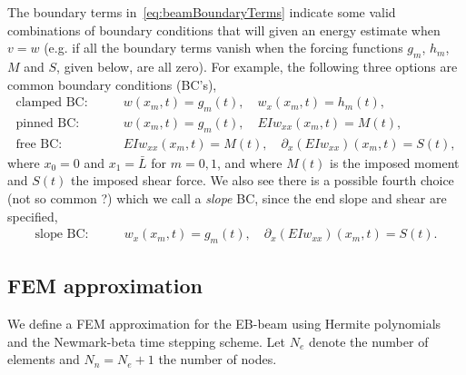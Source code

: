 \documentclass[11pt]{article}
\newcommand{\Ls}{\bar{L}}
\begin{document}
The boundary terms in~\eqref{eq:beamBoundaryTerms} indicate some valid combinations of boundary conditions that will given an energy estimate
when $v=w$ (e.g. if all the boundary terms vanish when the forcing functions $g_m$, $h_m$, $M$ and $S$, given below, are all zero). 
For example, the following three options are common boundary conditions (BC's), 
\begin{align}
   \text{clamped BC:}\quad & \quad w(x_m,t)=g_m(t),\quad  w_x(x_m,t)=h_m(t),  \\
   \text{pinned BC:} \quad & \quad w(x_m,t)=g_m(t), \quad E I w_{xx}(x_m,t)=M(t), \\
   \text{free BC:}   \quad & \quad  E I w_{xx}(x_m,t)=M(t), \quad \partial_x( E I w_{xx})(x_m,t)=S(t),
\end{align}
where $x_0=0$ and $x_1=\Ls$ for $m=0,1$, and 
where $M(t)$ is the imposed moment and $S(t)$ the imposed shear force. 
We also see there is a possible fourth choice (not so common ?) which we call a {\em slope} BC, since
the end slope and shear are specified, 
\begin{align}
   \text{slope BC:}\quad & \quad w_x(x_m,t)=g_m(t),\quad  \partial_x( E I w_{xx})(x_m,t)=S(t). 
\end{align}


\newcommand{\Ne}{N_e}%
\newcommand{\Nn}{N_n}%
\newcommand{\dx}{\Delta x}
\newcommand{\Mt}{\tilde{M}}
\newcommand{\Kt}{\tilde{K}}
\newcommand{\Bt}{\tilde{B}}
\newcommand{\Bc}{\mathcal{B}}
\subsection{FEM approximation}\label{sec:BeamModelFEM}

We define a FEM approximation for the EB-beam using Hermite polynomials and the Newmark-beta time stepping scheme.
Let $\Ne$ denote the number of elements and $\Nn=\Ne+1$ the number of nodes. 
\end{document}
